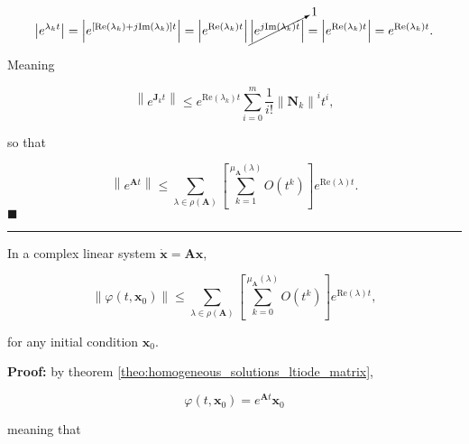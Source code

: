 \begin{equation} \left\lvert e^{\lambda_k t} \right\rvert  = \left\lvert e^{\left[\text{Re}\left(\lambda_k\right) + j\text{Im}\left(\lambda_k\right) \right]  t} \right\rvert = \left\lvert e^{\text{Re}\left(\lambda_k\right) t}\right\rvert \cancelto{1}{\left\lvert e^{j\text{Im}\left(\lambda_k\right)  t} \right\rvert} = \left\lvert e^{\text{Re}\left(\lambda_k\right) t}\right\rvert = e^{\text{Re}\left(\lambda_k\right) t}. \end{equation}

	Meaning

\begin{equation}\left\lVert e^{\mathbf{J}_kt}\right\rVert \leq e^{\text{Re}\left(\lambda_k\right) t} \sum_{i=0}^m \dfrac{1}{i!} \left\lVert \mathbf{N}_k \right\rVert^i t^i,\end{equation} 

	\noindent so that

\begin{equation} \left\lVert e^{\mathbf{A}t} \right\rVert \leq \sum_{\lambda\in\rho\left(\mathbf{A}\right)} \left[ \sum_{k=1}^{\mu_\mathbf{A}\left(\lambda\right)} O\left(t^k\right)\right] e^{\text{Re}\left(\lambda\right) t}. \end{equation}
\hfill$\blacksquare$
\vspace{5mm}
\hrule
\vspace{5mm}

\begin{theorem} \label{def:exp_charac} %
	In a complex linear system $\dot{\mathbf{x}} = \mathbf{Ax}$,

\begin{equation} \left\lVert \varphi\left(t,\mathbf{x}_0\right) \right\rVert \leq \sum_{\lambda\in\rho\left(\mathbf{A}\right)} \left[ \sum_{k=0}^{\mu_\mathbf{A}\left(\lambda\right)} O\left(t^k\right)\right] e^{\text{Re}\left(\lambda\right) t}, \label{theo:hurwitz_stable_exponential_stable_almost_exp} \end{equation}

\noindent for any initial condition $\mathbf{x}_0$.
\end{theorem}
\noindent\textbf{Proof:} by theorem \ref{theo:homogeneous_solutions_ltiode_matrix},

\begin{equation} \varphi\left(t,\mathbf{x}_0\right) = e^{\mathbf{A}t}\mathbf{x}_0 \end{equation}

	\noindent meaning that

